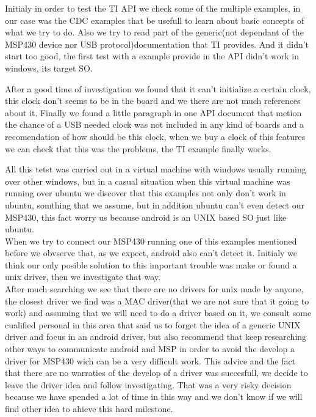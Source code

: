 		Initialy in order to test the TI API we check some of the multiple examples, in our case was the CDC examples that be usefull to learn about basic concepts of what we try to do. Also we try to read part of the generic(not dependant of the MSP430 device nor USB protocol)documentation that TI provides. And it didn't start too good, the first test with a example provide in the API didn't work in windows, its target SO.

		After a good time of investigation we found that it can't initialize a certain clock, this clock don't seems to be in the board and we there are not much references about it. Finally we found a little paragraph in one API document that metion the chance of a USB needed clock was not included in any kind of boards and a recomendation of how should be this clock, when we buy a clock of this features we can check that this was the problems, the TI example finally works.

		All this tetst was carried out in a virtual machine with windows usually running over other windows, but in a casual situation when this virtual machine was running over ubuntu we discover that this examples not only don't work in ubuntu, somthing that we assume, but in addition ubuntu can't even detect our MSP430, this fact worry us because android is an UNIX based SO just like ubuntu. \\

		When we try to connect our MSP430 running one of this examples mentioned before we obvserve that, as we expect, android also can't detect it. Initialy we think our only posible solution to this important trouble was make or found a unix driver, then we investigate that way. \\

		After much searching we see that there are no drivers for unix made by anyone, the closest driver we find was a MAC driver(that we are not sure that it going to work) and assuming that we will need to do a driver based on it, we consult some cualified personal in this area that said us to forget the idea of a generic UNIX driver and focus in an android driver, but also recommend that keep researching other ways to communicate android and MSP in order to avoid the develop a driver for MSP430 wich can be a very difficult work. This advice and the fact that there are no warraties of the develop of a driver was succesfull, we decide to leave the driver idea and follow investigating. That was a very risky decision because we have spended a lot of time in this way and we don't know if we will find other idea to ahieve this hard milestone.\\


